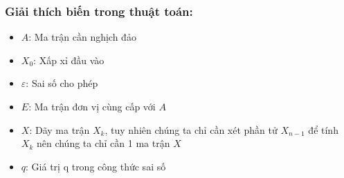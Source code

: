         \subsubsection{Giải thích biến trong thuật toán:}
            \begin{itemize}
                \item $A$: Ma trận cần nghịch đảo
                \item $X_{0}$: Xấp xỉ đầu vào
                \item $\varepsilon$: Sai số cho phép
                \item $E$: Ma trận đơn vị cùng cấp với $A$
                \item $X$: Dãy ma trận $X_{k}$, tuy nhiên chúng ta chỉ cần xét phần tử $X_{n-1}$ để tính $X_{k}$ nên chúng ta chỉ cần 1 ma trận $X$
                \item $q$: Giá trị q trong công thức sai số
            \end{itemize}

            



